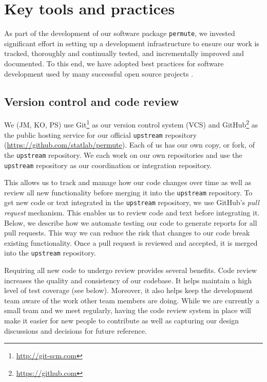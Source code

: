 \documentclass[]{article}
\begin{document}
\section{Key tools and practices}\label{key-tools}


As part of the development of our software package \texttt{permute}, we
invested significant effort in setting up a development infrastructure to
ensure our work is tracked, thoroughly and continually tested, and
incrementally improved and documented.
To this end, we have adopted best practices for software development used by
many successful open source projects \cite{millman2014developing}.

\subsection{\label{sec:vc}Version control and code review}

We (JM, KO, PS) use Git\footnote{\url{http://git-scm.com}} as our version
control system (VCS) and GitHub\footnote{\url{https://github.com}} as the
public hosting service for our official \texttt{upstream} repository
(\url{https://github.com/statlab/permute}).
Each of us has our own copy, or fork, of the \texttt{upstream} repository.
We each work on our own repositories and use the \texttt{upstream} repository
as our coordination or integration repository.

This allows us to track and manage how our code changes over time as well as
review all new functionality before merging it into the \texttt{upstream}
repository.
To get new code or text integrated in the \texttt{upstream} repository, we use
GitHub's \emph{pull request} mechanism.
This enables us to review code and text before integrating it.
Below, we describe how we automate testing our code to generate reports for all
pull requests.
This way we can reduce the risk that changes to our code break existing
functionality.
Once a pull request is reviewed and accepted, it is merged into the
\texttt{upstream} repository.

Requiring all new code to undergo review provides several benefits.
Code review increases the quality and consistency of our codebase.
It helps maintain a high level of test coverage (see below).
Moreover, it also helps keep the development team aware of the work other team
members are doing.
While we are currently a small team and we meet regularly, having the code
review system in place will make it easier for new people to contribute as well
as capturing our design discussions and decisions for future reference.
\end{document}
